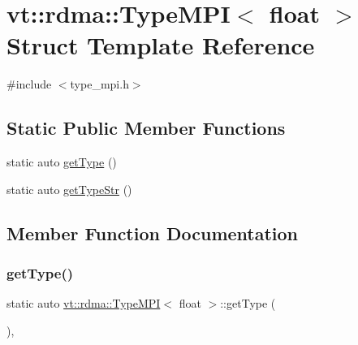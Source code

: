 \hypertarget{structvt_1_1rdma_1_1_type_m_p_i_3_01float_01_4}{}\section{vt\+:\+:rdma\+:\+:Type\+M\+PI$<$ float $>$ Struct Template Reference}
\label{structvt_1_1rdma_1_1_type_m_p_i_3_01float_01_4}


{\ttfamily \#include $<$type\+\_\+mpi.\+h$>$}

\subsection*{Static Public Member Functions}
\begin{DoxyCompactItemize}
\item 
static auto \hyperlink{structvt_1_1rdma_1_1_type_m_p_i_3_01float_01_4_a8213c65b1006e701f8dd99a035585cb0}{get\+Type} ()
\item 
static auto \hyperlink{structvt_1_1rdma_1_1_type_m_p_i_3_01float_01_4_a6387b37fdacc55aabead3c55a657088e}{get\+Type\+Str} ()
\end{DoxyCompactItemize}


\subsection{Member Function Documentation}
\mbox{\label{structvt_1_1rdma_1_1_type_m_p_i_3_01float_01_4_a8213c65b1006e701f8dd99a035585cb0}} 
\subsubsection{\texorpdfstring{get\+Type()}{getType()}}
{\footnotesize\ttfamily static auto \hyperlink{structvt_1_1rdma_1_1_type_m_p_i}{vt\+::rdma\+::\+Type\+M\+PI}$<$ float $>$\+::get\+Type (\begin{DoxyParamCaption}{ }\end{DoxyParamCaption})\hspace{0.3cm}{\ttfamily [inline]}, {\ttfamily [static]}}

\mbox{\label{structvt_1_1rdma_1_1_type_m_p_i_3_01float_01_4_a6387b37fdacc55aabead3c55a657088e}} 
